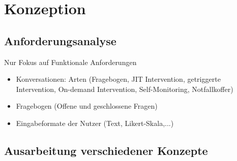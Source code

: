 \chapter{Konzeption}
\label{ch:Design}

\section{Anforderungsanalyse}

Nur Fokus auf Funktionale Anforderungen
\begin{itemize}
\item Konversationen: Arten (Fragebogen, JIT Intervention, getriggerte Intervention, On-demand Intervention, Self-Monitoring, Notfallkoffer)
\item Fragebogen (Offene und geschlossene Fragen)
\item Eingabeformate der Nutzer (Text, Likert-Skala,...)
\end{itemize}

\section{Ausarbeitung verschiedener Konzepte}

	




